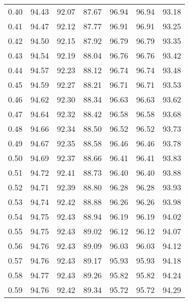 \begin{tabular}{|c|c|c|c|c|c|c|}
      0.40 &     94.43 &     92.07 &      87.67 &   96.94 &      96.94 &         93.18 \\
      0.41 &     94.47 &     92.12 &      87.77 &   96.91 &      96.91 &         93.25 \\
      0.42 &     94.50 &     92.15 &      87.92 &   96.79 &      96.79 &         93.35 \\
      0.43 &     94.54 &     92.19 &      88.04 &   96.76 &      96.76 &         93.42 \\
      0.44 &     94.57 &     92.23 &      88.12 &   96.74 &      96.74 &         93.48 \\
      0.45 &     94.59 &     92.27 &      88.21 &   96.71 &      96.71 &         93.53 \\
      0.46 &     94.62 &     92.30 &      88.34 &   96.63 &      96.63 &         93.62 \\
      0.47 &     94.64 &     92.32 &      88.42 &   96.58 &      96.58 &         93.68 \\
      0.48 &     94.66 &     92.34 &      88.50 &   96.52 &      96.52 &         93.73 \\
      0.49 &     94.67 &     92.35 &      88.58 &   96.46 &      96.46 &         93.78 \\
      0.50 &     94.69 &     92.37 &      88.66 &   96.41 &      96.41 &         93.83 \\
      0.51 &     94.72 &     92.41 &      88.73 &   96.40 &      96.40 &         93.88 \\
      0.52 &     94.71 &     92.39 &      88.80 &   96.28 &      96.28 &         93.93 \\
      0.53 &     94.74 &     92.42 &      88.88 &   96.26 &      96.26 &         93.98 \\
      0.54 &     94.75 &     92.43 &      88.94 &   96.19 &      96.19 &         94.02 \\
      0.55 &     94.75 &     92.43 &      89.02 &   96.12 &      96.12 &         94.07 \\
      0.56 &     94.76 &     92.43 &      89.09 &   96.03 &      96.03 &         94.12 \\
      0.57 &     94.76 &     92.43 &      89.17 &   95.93 &      95.93 &         94.18 \\
      0.58 &     94.77 &     92.43 &      89.26 &   95.82 &      95.82 &         94.24 \\
      0.59 &     94.76 &     92.42 &      89.34 &   95.72 &      95.72 &         94.29 \\

\end{tabular}
